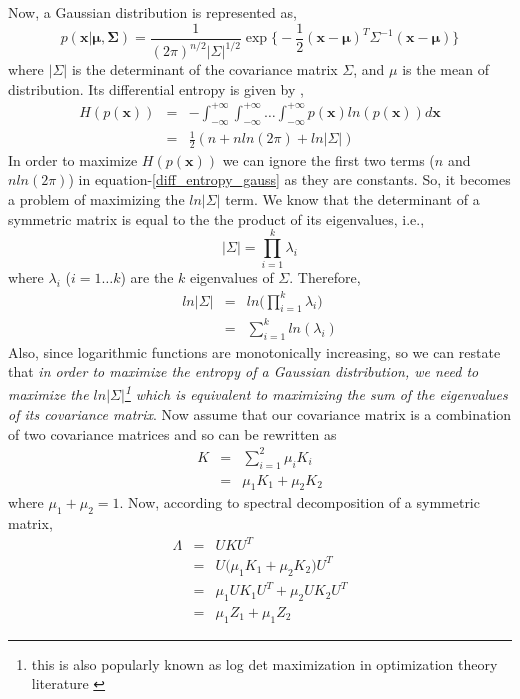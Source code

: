 Now, a Gaussian distribution is represented as,
\begin{equation}
p(\mathbf{x|\mu,\Sigma})=\frac{1}{(2\pi)^{n/2}\lvert\Sigma\rvert^{1/2}}\exp \big\lbrace -\frac{1}{2}(\mathbf{x-\mu})^{T}\Sigma^{-1} (\mathbf{x-\mu}) \big \rbrace
\end{equation}
where $\lvert\Sigma\rvert$ is the determinant of the covariance matrix $\Sigma$, and $\mu$ is the mean of distribution. Its differential entropy is given by \citep{brookes2005matrix},
\begin{eqnarray}
H(p(\mathbf{x})) &=& -\int_{-\infty}^{+\infty} \int_{-\infty}^{+\infty} \dots \int_{-\infty}^{+\infty}p(\mathbf{x})ln (p(\mathbf{x})) d\mathbf{x} \\
&=& \frac{1}{2}(n+n ln(2\pi)+ln|\Sigma|) \label{diff_entropy_gauss}
\end{eqnarray}
In order to maximize $H(p(\mathbf{x}))$ we can ignore the first two terms ($n$ and $n ln(2\pi)$) in equation-\ref{diff_entropy_gauss} as they are constants. So, it becomes a problem of maximizing the $ln|\Sigma|$ term. 
We know that the determinant of a symmetric matrix is equal to the the product of its eigenvalues, i.e.,
\[
|\Sigma|=\prod_{i=1}^{k}\lambda_{i}
\]
where $\lambda_{i}$ ($i=1\dots k$) are the $k$ eigenvalues of $\Sigma$. Therefore,
\begin{eqnarray}
ln|\Sigma|&=& ln\big (\prod_{i=1}^{k}\lambda_{i} \big) \\
&=& \sum_{i=1}^{k} ln (\lambda_{i}) \label{max_det}
\end{eqnarray}
Also, since logarithmic functions are monotonically increasing, so we can restate that \textit{in order to maximize the entropy of a Gaussian distribution, we need to maximize the $ln|\Sigma|$\footnote{this is also popularly known as log det maximization in optimization theory literature \citep{boyd2004convexopt}} which is equivalent to maximizing the sum of the eigenvalues of its covariance matrix}. Now assume that our covariance matrix is a combination of two covariance matrices and so can be rewritten as
\begin{eqnarray}
K &=& \sum_{i=1}^{2}\mu_{i}K_{i} \\
&=& \mu_{1}K_{1}+\mu_{2}K_{2}
\end{eqnarray}
where $\mu_{1}+\mu_{2}=1$. Now, according to spectral decomposition of a symmetric matrix,
\begin{eqnarray}
\Lambda &=& UKU^{T} \\ 
&=& U\big (\mu_{1}K_{1}+\mu_{2}K_{2} \big )U^{T} \\
&=& \mu_{1}UK_{1}U^{T}+\mu_{2}UK_{2}U^{T}  \\
&=& \mu_{1}Z_{1}+ \mu_{1}Z_{2} \label{eigv_split_1} 
\end{eqnarray}
